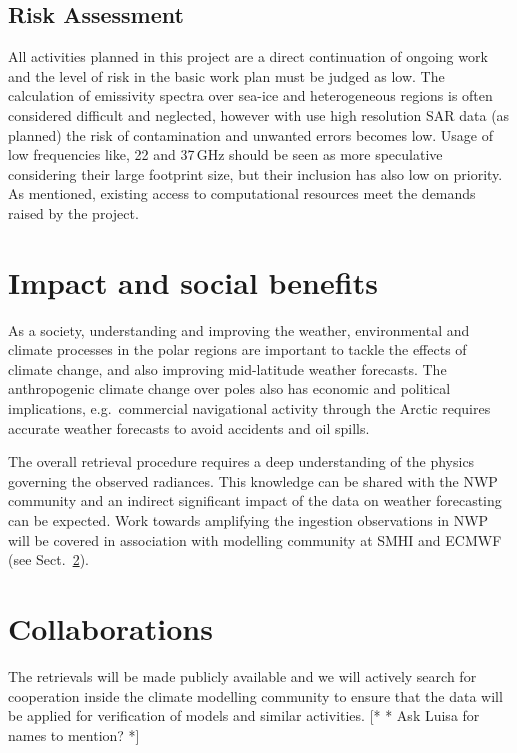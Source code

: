 \documentclass[12pt,oneside,a4paper]{article}
\newcommand\intodo[1]{{\color{red} [* #1 *]}}
\begin{document}
 
\subsection{Risk Assessment}
%
\label{sec:risk}
All activities planned in this project are a direct continuation of ongoing
work and the level of risk in the basic work plan must be judged as low. The
calculation of emissivity spectra over sea-ice and heterogeneous regions is
often considered difficult and neglected, however with use high resolution SAR
data (as planned) the risk of contamination and unwanted errors becomes low.
Usage of low frequencies like, 22 and 37\,GHz should be seen as more
speculative considering their large footprint size, but their inclusion has
also low on priority. As mentioned, existing access to computational resources
meet the demands raised by the project.


\section{Impact and social benefits}
%
\label{sec:impact}

As a society, understanding and improving the weather, environmental and
climate processes in the polar regions are important to tackle the effects
of climate change, and also improving mid-latitude weather forecasts. The
anthropogenic climate change over poles also has economic and political
implications, e.g.\ commercial navigational activity through the Arctic
requires accurate weather forecasts to avoid accidents and oil spills.

The overall retrieval procedure requires a deep understanding of the physics
governing the observed radiances. This knowledge can be shared with the NWP
community and an indirect significant impact of the data on weather forecasting
can be expected. Work towards amplifying the ingestion observations in NWP will
be covered in association with modelling community at SMHI and ECMWF (see
Sect.~\ref{sec:collaborations}).




\section{Collaborations}
%
\label{sec:collaborations}
The retrievals will be made publicly available and we will actively search
for cooperation inside the climate modelling community to ensure that the 
data will be applied for verification of models and similar activities. \intodo{* Ask
Luisa for names to mention?}
\end{document}
